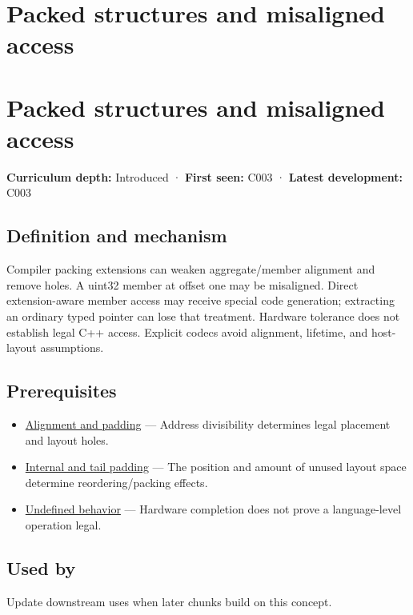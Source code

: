 \hypertarget{appendix-0682dbfc5f0e}{}
\section*{Packed structures and misaligned access}
\section{Packed structures and misaligned access}\label{packed-structures-and-misaligned-access}

\textbf{Curriculum depth:} Introduced · \textbf{First seen:} C003 · \textbf{Latest development:} C003

\subsection{Definition and mechanism}\label{definition-and-mechanism}

Compiler packing extensions can weaken aggregate/member alignment and remove holes. A uint32 member at offset one may be misaligned. Direct extension-aware member access may receive special code generation; extracting an ordinary typed pointer can lose that treatment. Hardware tolerance does not establish legal C++ access. Explicit codecs avoid alignment, lifetime, and host-layout assumptions.

\subsection{Prerequisites}\label{prerequisites}

\begin{itemize}
\tightlist
\item
  \hyperref[appendix-a1f7c53b4742]{Alignment and padding} --- Address divisibility determines legal placement and layout holes.
\item
  \hyperref[appendix-f52f8c5a3afd]{Internal and tail padding} --- The position and amount of unused layout space determine reordering/packing effects.
\item
  \hyperref[appendix-f558f5b4d8f2]{Undefined behavior} --- Hardware completion does not prove a language-level operation legal.
\end{itemize}

\subsection{Used by}\label{used-by}

Update downstream uses when later chunks build on this concept.

